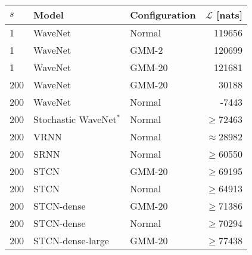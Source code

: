 {\begin{table}[t!]
    \centering
    \begin{tabular}{ll|lr}
        \toprule
        $s$ & \bfseries Model           & \bfseries Configuration           & \bfseries $\mathcal{L}$ [nats] \\
        \midrule
        1 & WaveNet                                                               & Normal & 119656 \\
        1 & WaveNet                                                               & GMM-2  & 120699 \\
        1 & WaveNet                                                               & GMM-20 & 121681 \\
        \midrule
        200 & WaveNet {\scriptsize \cite{aksan_stcn_2019}}                        & GMM-20    & 30188 \\
        200 & WaveNet {\scriptsize \cite{aksan_stcn_2019}}                        & Normal & -7443 \\
        200 & Stochastic WaveNet$^*$ {\scriptsize \cite{lai_stochastic_2018}}     & Normal & $\geq$72463\\
        200 & VRNN {\scriptsize \cite{chung_recurrent_2015}}                      & Normal & $\approx$28982\\
        200 & SRNN {\scriptsize \cite{fraccaro_sequential_2016}}                  & Normal & $\geq$60550 \\
        200 & STCN {\scriptsize \cite{aksan_stcn_2019}}                           & GMM-20 & $\geq$69195\\
        200 & STCN {\scriptsize \cite{aksan_stcn_2019}}                           & Normal & $\geq$64913\\
        200 & STCN-dense {\scriptsize \cite{aksan_stcn_2019}}                     & GMM-20 & $\geq$71386\\
        200 & STCN-dense {\scriptsize \cite{aksan_stcn_2019}}                     & Normal & $\geq$70294\\
        200 & STCN-dense-large {\scriptsize \cite{aksan_stcn_2019}}               & GMM-20 & $\geq$77438\\

\end{tabular}
\end{table}}
